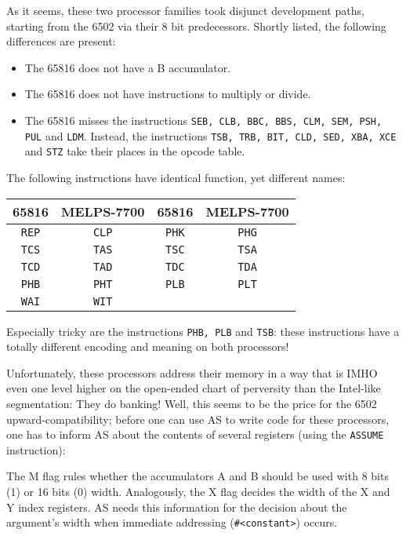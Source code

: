 \documentclass[12pt,twoside]{report}
\newcommand{\tty}[1]{{\tt #1}}
\begin{document}
As it seems, these two processor families took disjunct development
paths, starting from the 6502 via their 8 bit predecessors.  Shortly
listed, the following differences are present:
\begin{itemize}
\item{The 65816 does not have a B accumulator.}
\item{The 65816 does not have instructions to multiply or divide.}
\item{The 65816 misses the instructions \tty{SEB, CLB, BBC, BBS, CLM, SEM,
      PSH, PUL} and \tty{LDM}.  Instead, the instructions \tty{TSB, TRB, BIT, CLD,
      SED, XBA, XCE} and \tty{STZ} take their places in the opcode table.}
\end{itemize}
The following instructions have identical function, yet different
names:
\par
\begin{center}\begin{tabular}{|c|c||c|c|}
\hline
   65816  &  MELPS-7700 & 65816 &  MELPS-7700 \\
\hline
\hline
    \tty{REP}  &  \tty{CLP}  &  \tty{PHK}  &  \tty{PHG} \\
    \tty{TCS}  &  \tty{TAS}  &  \tty{TSC}  &  \tty{TSA} \\
    \tty{TCD}  &  \tty{TAD}  &  \tty{TDC}  &  \tty{TDA} \\
    \tty{PHB}  &  \tty{PHT}  &  \tty{PLB}  &  \tty{PLT} \\
    \tty{WAI}  &  \tty{WIT}  &             & \\
\hline
\end{tabular}\end{center}
\par
Especially tricky are the instructions \tty{PHB, PLB} and \tty{TSB}: these
instructions have a totally different encoding and meaning on both
processors!

Unfortunately, these processors address their memory in a way that is
IMHO even one level higher on the open-ended chart of perversity than
the Intel-like segmentation: They do banking!  Well, this seems to
be the price for the 6502 upward-compatibility; before one can use AS
to write code for these processors, one has to inform AS about the
contents of several registers (using the \tty{ASSUME} instruction):

The M flag rules whether the accumulators A and B should be used with
8 bits (1) or 16 bits (0) width.  Analogously, the X flag decides the
width of the X and Y index registers.  AS needs this information for
the decision about the argument's width when immediate addressing
(\verb!#<constant>!) occurs.
\end{document}
